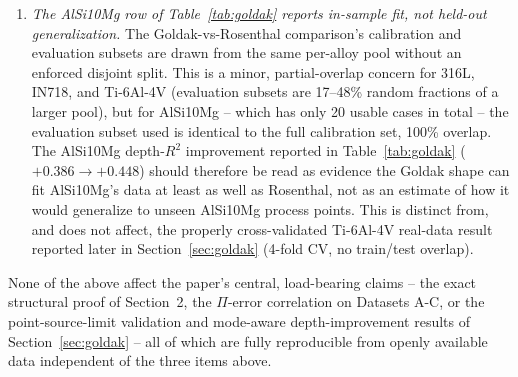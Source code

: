 \documentclass[12pt]{article}
\begin{document}
\begin{enumerate}
\item \emph{The AlSi10Mg row of Table~\ref{tab:goldak} reports in-sample fit, not held-out generalization.} The Goldak-vs-Rosenthal comparison's calibration and evaluation subsets are drawn from the same per-alloy pool without an enforced disjoint split. This is a minor, partial-overlap concern for 316L, IN718, and Ti-6Al-4V (evaluation subsets are 17--48\% random fractions of a larger pool), but for AlSi10Mg -- which has only 20 usable cases in total -- the evaluation subset used is identical to the full calibration set, 100\% overlap. The AlSi10Mg depth-$R^2$ improvement reported in Table~\ref{tab:goldak} ($+0.386\rightarrow+0.448$) should therefore be read as evidence the Goldak shape can fit AlSi10Mg's data at least as well as Rosenthal, not as an estimate of how it would generalize to unseen AlSi10Mg process points. This is distinct from, and does not affect, the properly cross-validated Ti-6Al-4V real-data result reported later in Section~\ref{sec:goldak} (4-fold CV, no train/test overlap).
\end{enumerate}
None of the above affect the paper's central, load-bearing claims -- the exact structural proof of Section~2, the $\Pi$-error correlation on Datasets A-C, or the point-source-limit validation and mode-aware depth-improvement results of Section~\ref{sec:goldak} -- all of which are fully reproducible from openly available data independent of the three items above.
\end{document}
